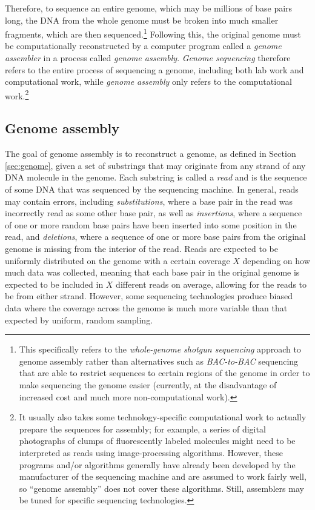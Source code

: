 \documentclass[10pt]{article}
\newcommand{\Section}[1]{Section \ref{#1}}
\newcommand{\KeyTerm}[1]{{\it #1}}
\begin{document}
Therefore, to sequence an entire genome, which may be millions of base pairs
long, the DNA from the whole genome must be broken into much smaller fragments,
which are then sequenced.\footnote{This specifically refers to the
\KeyTerm{whole-genome shotgun sequencing} approach to genome assembly rather
than alternatives such as \KeyTerm{BAC-to-BAC} sequencing that are able to
restrict sequences to certain regions of the genome in order to make sequencing
the genome easier (currently, at the disadvantage of increased cost and much more
non-computational work).} Following this, the original genome must be
computationally reconstructed by a computer program called a \KeyTerm{genome
assembler} in a process called \KeyTerm{genome assembly}.  \KeyTerm{Genome
sequencing} therefore refers to the entire process of sequencing a genome,
including both lab work and computational work, while \KeyTerm{genome assembly}
only refers to the computational work.\footnote{It usually also takes some
technology-specific computational work to actually prepare the sequences for
assembly; for example, a series of digital photographs of clumps of
fluorescently labeled molecules might need to be interpreted as reads using
image-processing algorithms.  However, these programs and/or algorithms
generally have already been developed by the manufacturer of the sequencing
machine and are assumed to work fairly well, so ``genome assembly'' does not cover these
algorithms.  Still, assemblers may be tuned for specific sequencing
technologies.}

\subsection{Genome assembly}

\label{subsec:reads}

The goal of genome assembly is to reconstruct a genome, as defined in
\Section{sec:genome}, given a set of substrings that may originate from any
strand of any DNA molecule in the genome.  Each substring is called a
\KeyTerm{read} and is the sequence of some DNA that was sequenced by the
sequencing machine.  In general, reads may contain errors, including
\KeyTerm{substitutions}, where a base pair in the read was incorrectly read as
some other base pair, as well as \KeyTerm{insertions}, where a sequence of one
or more random base pairs have been inserted into some position in the read, and
\KeyTerm{deletions}, where a sequence of one or more base pairs from the
original genome is missing from the interior of the read.  Reads are expected to
be uniformly distributed on the genome with a certain coverage $X$ depending on
how much data was collected, meaning that each base pair in the original genome
is expected to be included in $X$ different reads on average, allowing for the
reads to be from either strand.  However, some sequencing technologies produce
biased data where the coverage across the genome is much more variable than that
expected by uniform, random sampling.
\end{document}
